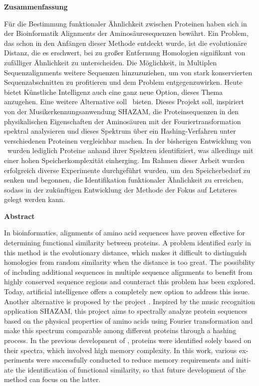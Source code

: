 \label{sec:abstract}
    \begin{center}
      \textbf{Zusammenfassung}
    \end{center}
    Für die Bestimmung funktionaler Ähnlichkeit zwischen Proteinen haben sich in der Bioinformatik Alignments der Aminosäuresequenzen bewährt. Ein Problem, das schon in den Anfängen dieser Methode entdeckt wurde, ist die evolutionäre Distanz, die es erschwert, bei zu großer Entfernung Homologien signifikant von zufälliger Ähnlichkeit zu unterscheiden. Die Möglichkeit, in Multiplen Sequenzalignments weitere Sequenzen hinzuzuziehen, um von stark konservierten Sequenzabschnitten zu profitieren und dem Problem entgegenzuwirken. Heute bietet Künstliche Intelligenz auch eine ganz neue Option, dieses Thema anzugehen. Eine weitere Alternative soll \protfin\ bieten. Dieses Projekt soll, inspiriert von der Musikerkennungsanwendung SHAZAM, die Proteinsequenzen in den physikalischen Eigenschaften der Aminosäuren mit der Fouriertransformation spektral analysieren und dieses Spektrum über ein Hashing-Verfahren unter verschiedenen Proteinen vergleichbar machen. In der bisherigen Entwicklung von \protfin\ wurden lediglich Proteine anhand ihrer Spektren identifiziert, was allerdings mit einer hohen Speicherkomplexität einherging. Im Rahmen dieser Arbeit wurden erfolgreich diverse Experimente durchgeführt wurden, um den Speicherbedarf zu senken und begonnen, die Identifikation funktionaler Ähnlichkeit zu erreichen, sodass in der zukünftigen Entwicklung der Methode der Fokus auf Letzteres gelegt werden kann.
\vspace{4em}
    \begin{otherlanguage}{english}
        \begin{center}
          \textbf{Abstract}
        \end{center}
        In bioinformatics, alignments of amino acid sequences have proven effective for determining functional similarity between proteins. A problem identified early in this method is the evolutionary distance, which makes it difficult to distinguish homologies from random similarity when the distance is too great. The possibility of including additional sequences in multiple sequence alignments to benefit from highly conserved sequence regions and counteract this problem has been explored. Today, artificial intelligence offers a completely new option to address this issue. Another alternative is proposed by the project \protfin. Inspired by the music recognition application SHAZAM, this project aims to spectrally analyze protein sequences based on the physical properties of amino acids using Fourier transformation and make this spectrum comparable among different proteins through a hashing process. In the previous development of \protfin, proteins were identified solely based on their spectra, which involved high memory complexity. In this work, various experiments were successfully conducted to reduce memory requirements and initiate the identification of functional similarity, so that future development of the method can focus on the latter.
    \end{otherlanguage}